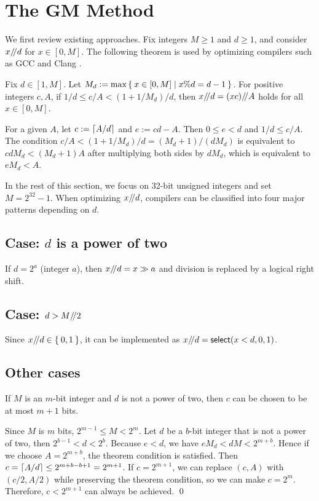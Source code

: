 \documentclass{article}
\begin{document}
\section{The GM Method}
We first review existing approaches.
Fix integers $M \geq 1$ and $d \geq 1$, and consider $x {\mathbin{/\mkern-4mu/}} d$ for $x \in [0, M]$.
The following theorem is used by optimizing compilers such as GCC and Clang \cite{GM}\cite{Hacker}\cite{Optimal}.
\begin{theorem}[GM-method]\label{TH_GM}
Fix $d \in [1, M]$.
Let $M_d := \max \Set{x \in [0, M] \mid x {\rm \% } d=d-1}$.
For positive integers $c, A$, if $1/d \leq c/A < (1+1/M_d)/d$, then $x {\mathbin{/\mkern-4mu/}} d=(xc) {\mathbin{/\mkern-4mu/}} A$ holds for all $x \in [0, M]$.
\end{theorem}

For a given $A$, let $c := \lceil A/d \rceil$ and $e := cd - A$.
Then $0 \leq e < d$ and $1/d \leq c/A$.
The condition $c/A < (1+1/M_d)/d = (M_d+1)/(dM_d)$ is equivalent to $cdM_d < (M_d+1)A$ after multiplying both sides by $dM_d$, which is equivalent to $eM_d < A$.

In the rest of this section, we focus on 32-bit unsigned integers and set $M = 2^{32}-1$.
When optimizing $x {\mathbin{/\mkern-4mu/}} d$, compilers can be classified into four major patterns depending on $d$.



\subsection{Case: $d$ is a power of two}
If $d=2^a$ (integer $a$), then $x {\mathbin{/\mkern-4mu/}} d = x \gg a$ and division is replaced by a logical right shift.

\subsection{Case: $d>M {\mathbin{/\mkern-4mu/}} 2$}
Since $x {\mathbin{/\mkern-4mu/}} d \in \Set{0,1}$, it can be implemented as $x {\mathbin{/\mkern-4mu/}} d = \mathsf{select}(x<d, 0, 1)$.

\subsection{Other cases}
\begin{lemma}
If $M$ is an $m$-bit integer and $d$ is not a power of two, then $c$ can be chosen to be at most $m+1$ bits.
\end{lemma}
Since $M$ is $m$ bits, $2^{m-1} \leq M < 2^m$.
Let $d$ be a $b$-bit integer that is not a power of two, then $2^{b-1} < d < 2^b$.
Because $e<d$, we have $eM_d < dM < 2^{m+b}$.
Hence if we choose $A=2^{m+b}$, the theorem condition is satisfied.
Then $c=\lceil A/d \rceil \leq 2^{m+b-b+1}=2^{m+1}$.
If $c=2^{m+1}$, we can replace $(c, A)$ with $(c/2, A/2)$ while preserving the theorem condition, so we can make $c=2^m$.
Therefore, $c<2^{m+1}$ can always be achieved.
\qed
\end{document}
